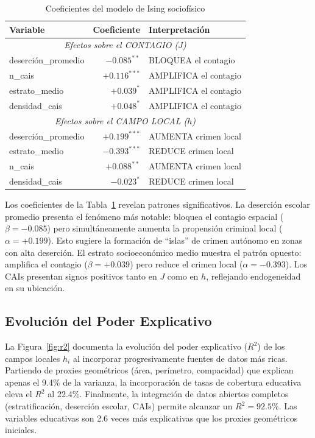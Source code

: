 \documentclass[12pt,a4paper]{article}
\begin{document}
\begin{table}[H]
\centering
\caption{Coeficientes del modelo de Ising sociofísico}
\label{tab:coeficientes}
\begin{tabular}{@{}lrl@{}}
\toprule
\textbf{Variable} & \textbf{Coeficiente} & \textbf{Interpretación} \\
\midrule
\multicolumn{3}{c}{\textit{Efectos sobre el CONTAGIO ($J$)}} \\
\midrule
deserción\_promedio & $-0.085^{**}$ & BLOQUEA el contagio \\
n\_cais & $+0.116^{***}$ & AMPLIFICA el contagio \\
estrato\_medio & $+0.039^{*}$ & AMPLIFICA el contagio \\
densidad\_cais & $+0.048^{*}$ & AMPLIFICA el contagio \\
\midrule
\multicolumn{3}{c}{\textit{Efectos sobre el CAMPO LOCAL ($h$)}} \\
\midrule
deserción\_promedio & $+0.199^{***}$ & AUMENTA crimen local \\
estrato\_medio & $-0.393^{***}$ & REDUCE crimen local \\
n\_cais & $+0.088^{**}$ & AUMENTA crimen local \\
densidad\_cais & $-0.023^{*}$ & REDUCE crimen local \\
\bottomrule
\end{tabular}
\end{table}

Los coeficientes de la Tabla~\ref{tab:coeficientes} revelan patrones significativos. La deserción escolar promedio presenta el fenómeno más notable: bloquea el contagio espacial ($\beta = -0.085$) pero simultáneamente aumenta la propensión criminal local ($\alpha = +0.199$). Esto sugiere la formación de ``islas'' de crimen autónomo en zonas con alta deserción. El estrato socioeconómico medio muestra el patrón opuesto: amplifica el contagio ($\beta = +0.039$) pero reduce el crimen local ($\alpha = -0.393$). Los CAIs presentan signos positivos tanto en $J$ como en $h$, reflejando endogeneidad en su ubicación.

\subsection{Evolución del Poder Explicativo}

La Figura~\ref{fig:r2} documenta la evolución del poder explicativo ($R^2$) de los campos locales $h_i$ al incorporar progresivamente fuentes de datos más ricas. Partiendo de proxies geométricos (área, perímetro, compacidad) que explican apenas el 9.4\% de la varianza, la incorporación de tasas de cobertura educativa eleva el $R^2$ al 22.4\%. Finalmente, la integración de datos abiertos completos (estratificación, deserción escolar, CAIs) permite alcanzar un \textbf{$R^2 = 92.5\%$}. Las variables educativas son 2.6 veces más explicativas que los proxies geométricos iniciales.
\end{document}
